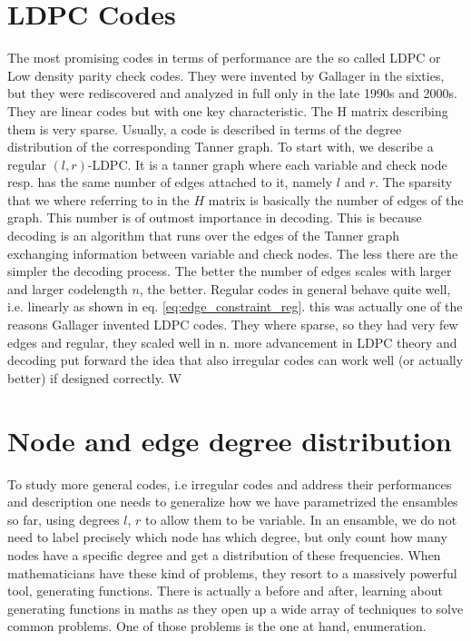 \section{LDPC Codes}
The most promising codes in terms of performance are the so called LDPC or Low density parity check codes. They were invented by Gallager in the sixties, but they were rediscovered and analyzed in full only in the late 1990s and 2000s. They are linear codes but with one key characteristic. The H matrix describing them is very sparse. Usually, a code is described in terms of the degree distribution of the corresponding Tanner graph. To start with, we describe a regular $(l,r)$-LDPC. It is a tanner graph where each variable and check node resp. has the same number of edges attached to it, namely $l$ and $r$. The sparsity that we where referring to in the $H$ matrix is basically the number of edges of the graph. This number is of outmost importance in decoding. This is because decoding is an algorithm that runs over the edges of the Tanner graph exchanging information between variable and check nodes. The less there are the simpler the decoding process. The better the number of edges scales with larger and larger codelength $n$, the better. Regular codes in general behave quite well, i.e. linearly as shown in eq. \ref{eq:edge_constraint_reg}. this was actually one of the reasons Gallager invented LDPC codes. They where sparse, so they had very few edges and regular, they scaled well in n. more advancement in LDPC theory and decoding put forward the idea that also irregular codes can work well (or actually better) if designed correctly. W

\section{Node and edge degree distribution}
To study more general codes, i.e irregular codes and address their performances and description one needs to generalize how we have parametrized the ensambles so far, using degrees $l$, $r$ to allow them to be variable. In an ensamble, we do not need to label precisely which node has which degree, but only count how many nodes have a specific degree and get a distribution of these frequencies. When mathematicians have these kind of problems, they resort to a massively powerful tool, generating functions. There is actually a before and after, learning about generating functions in maths as they open up a wide array of techniques to solve common problems. One of those problems is the one at hand, enumeration. 

